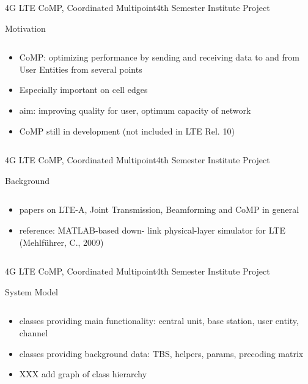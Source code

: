 \documentclass[xcolor={cmyk}]{beamer}
\begin{document}
 \begin{frame}{4G LTE CoMP, Coordinated Multipoint}{4th Semester Institute Project}
	 \begin{block}{Motivation}
	 	\begin{columns}
			\begin{column}{.9\textwidth}
				\begin{itemize}
					\item CoMP: optimizing performance by sending and receiving data to and from User Entities from several points
					\item Especially important on cell edges
					\item aim: improving quality for user, optimum capacity of network 
					\item CoMP still in development (not included in LTE Rel. 10)
				\end{itemize}
			\end{column}
		\end{columns}
	 \end{block}
 \end{frame}

 \begin{frame}{4G LTE CoMP, Coordinated Multipoint}{4th Semester Institute Project}
	 \begin{block}{Background}
	 	\begin{columns}
			\begin{column}{.9\textwidth}
				\begin{itemize}
					\item papers on LTE-A, Joint Transmission, Beamforming and CoMP in general
					\item reference: MATLAB-based down-
link physical-layer simulator for LTE (Mehlführer, C., 2009)
				\end{itemize}
			\end{column}
		\end{columns}
	 \end{block}
 \end{frame}

 \begin{frame}{4G LTE CoMP, Coordinated Multipoint}{4th Semester Institute Project}
	 \begin{block}{System Model}
	 	\begin{columns}
			\begin{column}{.9\textwidth}
				\begin{itemize}
					\item classes providing main functionality: central unit, base station, user entity, channel
					\item classes providing background data: TBS, helpers, params, precoding matrix
					\item XXX add graph of class hierarchy
				\end{itemize}
			\end{column}
		\end{columns}
	 \end{block}
 \end{frame}
 
\end{document}
